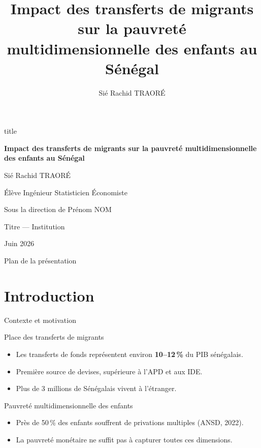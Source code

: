 \documentclass[10pt,aspectratio=169]{beamer}
\title[Transferts de migrants et pauvreté des enfants]{%
  Impact des transferts de migrants sur la pauvreté\\
  multidimensionnelle des enfants au Sénégal}
\subtitle{}
\author[]{Sié Rachid TRAORÉ}
\institute[]{}
\date{}
\begin{document}
\begingroup
{}
\begin{frame}
  \centering
  \vspace{0.45cm}
  \begin{beamercolorbox}[sep=8pt,center,rounded=true,shadow=true]{title}
    {\LARGE\bfseries\color{white}
      Impact des transferts de migrants sur la pauvreté
      multidimensionnelle des enfants au Sénégal\par}
  \end{beamercolorbox}
  \vspace{0.55cm}
  {\large Sié Rachid TRAORÉ\par}\vspace{0.15cm}
  {\small Élève Ingénieur Statisticien Économiste\par}
  \vfill
  {\small Sous la direction de Prénom NOM\par}\vspace{0.12cm}
  {\small Titre --- Institution\par}
  \vspace{0.25cm}
  {\small Juin 2026\par}
\end{frame}
\endgroup

\begin{frame}{Plan de la présentation}
  \tableofcontents
\end{frame}


\section[Intro]{Introduction}

\begin{frame}{Contexte et motivation}
  \begin{block}{Place des transferts de migrants}
    \begin{itemize}
      \item Les transferts de fonds représentent environ \textbf{10--12\,\%} du PIB sénégalais.
      \item Première source de devises, supérieure à l'APD et aux IDE.
      \item Plus de 3 millions de Sénégalais vivent à l'étranger.
    \end{itemize}
  \end{block}
  \begin{alertblock}{Pauvreté multidimensionnelle des enfants}
    \begin{itemize}
      \item Près de 50\,\% des enfants souffrent de privations multiples (ANSD, 2022).
      \item La pauvreté monétaire ne suffit pas à capturer toutes ces dimensions.
    \end{itemize}
  \end{alertblock}
\end{frame}
\end{document}
